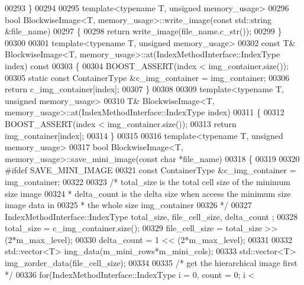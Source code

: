\begin{DoxyCode}
00293 \}
00294 
00295 \textcolor{keyword}{template}<\textcolor{keyword}{typename} T, \textcolor{keywordtype}{unsigned} memory\_usage>
00296 \textcolor{keywordtype}{bool} BlockwiseImage<T, memory_usage>::write_image(\textcolor{keyword}{const} std::string &file\_name)
00297 \{
00298         \textcolor{keywordflow}{return} write\_image(file\_name.c\_str());
00299 \}
00300 
00301 \textcolor{keyword}{template}<\textcolor{keyword}{typename} T, \textcolor{keywordtype}{unsigned} memory\_usage>
00302 \textcolor{keyword}{const} T& BlockwiseImage<T, memory_usage>::at(IndexMethodInterface::IndexType 
      index)\textcolor{keyword}{ const}
00303 \textcolor{keyword}{}\{
00304         BOOST\_ASSERT(index < img\_container.size());
00305         \textcolor{keyword}{static} \textcolor{keyword}{const} ContainerType &c\_img\_container = img\_container;
00306         \textcolor{keywordflow}{return} c\_img\_container[index];
00307 \}
00308 
00309 \textcolor{keyword}{template}<\textcolor{keyword}{typename} T, \textcolor{keywordtype}{unsigned} memory\_usage>
00310 T& BlockwiseImage<T, memory_usage>::at(IndexMethodInterface::IndexType index)
00311 \{
00312         BOOST\_ASSERT(index < img\_container.size());
00313         \textcolor{keywordflow}{return} img\_container[index];
00314 \}
00315 
00316 \textcolor{keyword}{template}<\textcolor{keyword}{typename} T, \textcolor{keywordtype}{unsigned} memory\_usage>
00317 \textcolor{keywordtype}{bool} BlockwiseImage<T, memory_usage>::save_mini_image(\textcolor{keyword}{const} \textcolor{keywordtype}{char} *file\_name) 
00318 \{
00319 
00320 \textcolor{preprocessor}{#ifdef SAVE\_MINI\_IMAGE}
00321 \textcolor{preprocessor}{}        \textcolor{keyword}{const} ContainerType &c\_img\_container = img\_container;
00322 
00323         \textcolor{comment}{/* total\_size is the total cell size of the minimum size image}
00324 \textcolor{comment}{         * delta\_count is the delta size when access the minimum size image
       data in }
00325 \textcolor{comment}{         * the whole size img\_container}
00326 \textcolor{comment}{         */}
00327         IndexMethodInterface::IndexType total\_size, file\_cell\_size, delta\_count
      ;
00328         total\_size = c\_img\_container.size();
00329         file\_cell\_size = total\_size >> (2*m\_max\_level);
00330         delta\_count = 1 << (2*m\_max\_level);
00331 
00332         std::vector<T> img\_data(m\_mini\_rows*m\_mini\_cols);
00333         std::vector<T> img\_zorder\_data(file\_cell\_size);
00334 
00335         \textcolor{comment}{/* get the hierarchical image first */}
00336         \textcolor{keywordflow}{for}(IndexMethodInterface::IndexType i = 0, count = 0; i < 

\end{DoxyCode}
